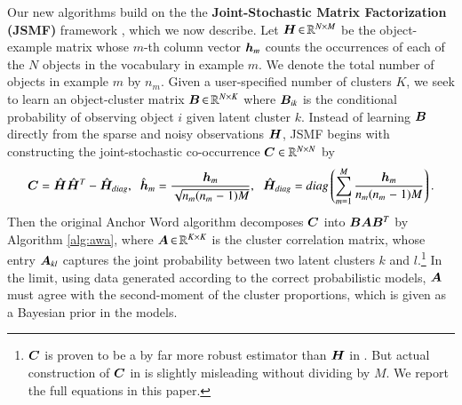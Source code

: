 Our new algorithms build on the the \textbf{Joint-Stochastic Matrix
Factorization (JSMF)} framework \cite{moontae2015nips}, which we now describe.
Let $\bm{H} \operatorname{\in} \mathbb{R}^{N \mathrel{\times} M}$ be the object-example matrix whose $m$-th column
vector $\bm{h}_m$ counts the occurrences of each of the $N$ objects in the
vocabulary in example $m$. We denote the total number of objects in example $m$
by $n_m$. Given a user-specified number of clusters $K$, we seek to learn an
object-cluster matrix $\bm{B} \operatorname{\in} \mathbb{R}^{N \mathrel{\times} K}$ where $\bm{B}_{ik}$ is the
conditional probability of observing object $i$ given latent cluster $k$.
Instead of learning $\bm{B}$ directly from the sparse and noisy observations $\bm{H}$,
JSMF begins with constructing the joint-stochastic co-occurrence $\bm{C} \in \mathbb{R}^
{N \mathrel{\times} N}$ by
\begin{equation}
	\bm{C} = \smash{\hat{\bm{H}}} \smash{\hat{\bm{H}}}^T - \smash{\hat{\bm{H}}_{diag}}, \;\; \smash{\hat{\bm{h}}}_m \mathrel{=} \frac{\bm{h}_m}{\sqrt{n_m
	(n_m \mathrel{-} 1)M}}, \;\; \smash{\hat{\bm{H}}_{diag}} \mathrel{=} diag \left( \sum_{m=1}^M \frac{\bm{h}_m}
	{n_m(n_m \mathrel{-} 1)M} \right).
	\label{eqn:unbiased}
\end{equation}
Then the original Anchor Word algorithm decomposes $\bm{C}$ into $\bm{B} \bm{A} \bm{B}^T$ by
Algorithm \ref{alg:awa}, where $\bm{A} \operatorname{\in} \mathbb{R}^{K \mathrel{\times} K}$ is the cluster
correlation matrix, whose entry $\bm{A}_{kl}$ captures the joint probability
between two latent clusters $k$ and $l$.\footnote{$\bm{C}$ is proven to be a by far
more robust estimator than $\bm{H}$ in \cite{AGM}.  But actual construction of
$\bm{C}$ in \cite{arora2013practical} is slightly misleading without dividing
by $M$. We report the full equations in this paper.} In the limit, using data
generated according to the correct probabilistic models, $\bm{A}$ must agree with
the second-moment of the cluster proportions, which is given as a Bayesian prior
in the models.

